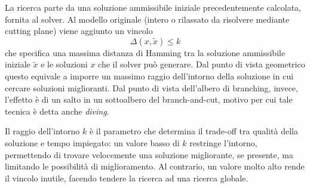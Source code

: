 La ricerca parte da una soluzione ammissibile iniziale precedentemente calcolata, fornita al solver. Al modello originale (intero o rilassato da risolvere mediante cutting plane) viene aggiunto un vincolo
\begin{equation}
  \Delta(x, \tilde{x}) \leq k \label{eqn:hfconst}
\end{equation}
che specifica una massima distanza di Hamming tra la soluzione ammissibile iniziale $\tilde{x}$ e le soluzioni $x$ che il solver può generare. Dal punto di vista geometrico questo equivale a imporre un massimo raggio dell’intorno della soluzione in cui cercare soluzioni miglioranti. Dal punto di vista dell’albero di branching, invece, l’effetto è di un salto in un sottoalbero del branch-and-cut, motivo per cui tale tecnica è detta anche \textit{diving}.

Il raggio dell’intorno $k$ è il parametro che determina il trade-off tra qualità della soluzione e tempo impiegato: un valore basso di $k$ restringe l’intorno, permettendo di trovare velocemente una soluzione migliorante, se presente, ma limitando le possibilità di miglioramento. Al contrario, un valore molto alto rende il vincolo inutile, facendo tendere la ricerca ad una ricerca globale.


